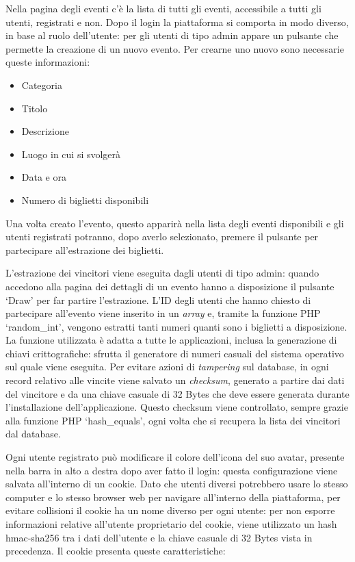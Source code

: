 \documentclass[italian,12pt,a4paper,oneside,final]{report}
\begin{document}
Nella pagina degli eventi c'è la lista di tutti gli eventi, accessibile a tutti gli utenti, registrati e non.
Dopo il login la piattaforma si comporta in modo diverso, in base al ruolo dell'utente: per gli utenti di tipo admin appare un pulsante che permette la creazione di un nuovo evento.
Per crearne uno nuovo sono necessarie queste informazioni:

\begin{itemize}
	\item Categoria
	\item Titolo
	\item Descrizione
	\item Luogo in cui si svolgerà
	\item Data e ora
	\item Numero di biglietti disponibili
\end{itemize}
Una volta creato l'evento, questo apparirà nella lista degli eventi disponibili e gli utenti registrati potranno, dopo averlo selezionato, premere il pulsante per partecipare all'estrazione dei biglietti.

L'estrazione dei vincitori viene eseguita dagli utenti di tipo admin: quando accedono alla pagina dei dettagli di un evento hanno a disposizione il pulsante `Draw' per far partire l'estrazione.
L'ID degli utenti che hanno chiesto di partecipare all'evento viene inserito in un \textit{array} e, tramite la funzione PHP `random\_int', vengono estratti tanti numeri quanti sono i biglietti a disposizione.
La funzione utilizzata è adatta a tutte le applicazioni, inclusa la generazione di chiavi crittografiche: sfrutta il generatore di numeri casuali del sistema operativo sul quale viene eseguita.
Per evitare azioni di \textit{tampering} sul database, in ogni record relativo alle vincite viene salvato un \textit{checksum}, generato a partire dai dati del vincitore e da una chiave casuale di 32 Bytes che deve essere generata durante l'installazione dell'applicazione.
Questo checksum viene controllato, sempre grazie alla funzione PHP `hash\_equals', ogni volta che si recupera la lista dei vincitori dal database.

Ogni utente registrato può modificare il colore dell'icona del suo avatar, presente nella barra in alto a destra dopo aver fatto il login: questa configurazione viene salvata all'interno di un cookie.
Dato che utenti diversi potrebbero usare lo stesso computer e lo stesso browser web per navigare all'interno della piattaforma, per evitare collisioni il cookie ha un nome diverso per ogni utente: per non esporre informazioni relative all'utente proprietario del cookie, viene utilizzato un hash hmac-sha256 tra i dati dell'utente e la chiave casuale di 32 Bytes vista in precedenza.
Il cookie presenta queste caratteristiche:
\end{document}
